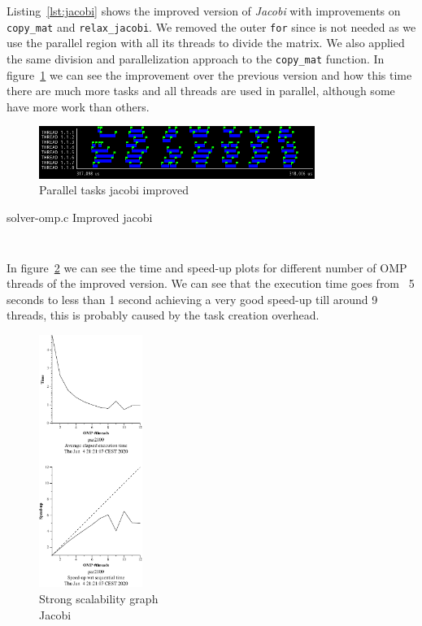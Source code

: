 Listing~\ref{lst:jacobi} shows the improved version of \emph{Jacobi} with improvements on \texttt{copy\_mat}
and \texttt{relax\_jacobi}. We removed the outer \texttt{for}
since is not needed as we use the parallel region with all its threads to divide the matrix. We also
applied the same division and parallelization approach to the \texttt{copy\_mat} function.
In figure~\ref{fig:trace-jacobi1} we can see the improvement over the previous version and how this time
there are much more tasks and all threads are used in parallel, although some have more work than others.

\begin{figure}[H]
    \centering
    \includegraphics[width=0.8\textwidth]{jacobi_1_tasks}
    \caption{Parallel tasks jacobi improved}%
    \label{fig:trace-jacobi1}
\end{figure}

\begin{listing}[H]
    \caption{solver-omp.c Improved jacobi}%
    \label{lst:jacobi}
    \inputminted[firstline=8,lastline=19]{c}{code/solver-omp.c}
    \vspace{-2.5em}
    \inputminted[firstline=25,lastline=52]{c}{code/solver-omp.c}
\end{listing}

\pagebreak

In figure~\ref{fig:strong-jacobi} we can see the time and speed-up plots for different number 
of OMP threads of the improved version.
We can see that the execution time goes from ~5 seconds to less than 1 second
achieving a very good speed-up till around 9 threads, this is probably caused by the task creation
overhead.

\begin{figure}[H]
    \centering
    \includegraphics[width=0.3\textwidth]{heat-omp-strong-jacobi-crop}
    \caption{Strong scalability graph \\ Jacobi}%
    \label{fig:strong-jacobi}
\end{figure}



